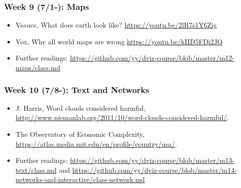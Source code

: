
\subsubsection{Week 9 (7/1-): Maps }%

\begin{itemize}\itemsep0em 
\item Vsauce, What does earth look like? \url{https://youtu.be/2lR7s1Y6Zig}
\item Vox, Why all world maps are wrong \url{https://youtu.be/kIID5FDi2JQ}
\item Further readings: \url{https://github.com/yy/dviz-course/blob/master/m12-maps/class.md}
\end{itemize}	
\subsubsection{Week 10 (7/8-): Text and Networks } %

\begin{itemize}\itemsep0em 
\item J. Harris, Word clouds considered harmful, \url{http://www.niemanlab.org/2011/10/word-clouds-considered-harmful/}. 
\item The Observatory of Economic Complexity, \url{https://atlas.media.mit.edu/en/profile/country/usa/}.
\item Further readings: \url{https://github.com/yy/dviz-course/blob/master/m13-text/class.md} and \url{https://github.com/yy/dviz-course/blob/master/m14-networks-and-interactive/class-network.md}
\end{itemize}	
